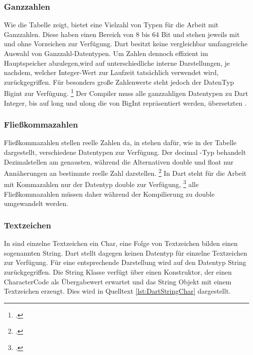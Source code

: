 \subsubsection{Ganzzahlen}
Wie die Tabelle zeigt,  bietet \Csharp eine Vielzahl von Typen für die Arbeit mit Ganzzahlen.  Diese haben einen Bereich von 8 bis 64 Bit und stehen jeweils mit und ohne Vorzeichen zur Verfügung.  Dart besitzt keine vergleichbar umfangreiche Auswahl von Ganzzahl-Datentypen.  Um Zahlen dennoch effizient im Hauptspeicher abzulegen,wird auf unterschiedliche interne Darstellungen,  je nachdem,  welcher Integer-Wert zur Laufzeit tatsächlich verwendet wird, zurückgegriffen.  Für besonders große Zahlenwerte steht jedoch der DatenTyp \glq Bigint \grq{}  zur Verfügung.  \footcite[Vgl. ][Abgerufen am \today]{Ford2019} Der Compiler muss alle ganzzahligen  \Csharp Datentypen zu Dart \glq Integer\grq,  bis auf \glq long\grq{} und \glq ulong\grq{} die von \glq BigInt\grq{}  repräsentiert werden, übersetzten . 

\subsubsection{Fließkommazahlen}


Fließkommazahlen stellen reelle Zahlen da,  in \Csharp stehen dafür, wie in der Tabelle dargestellt,  verschiedene Datentypen zur Verfügung.  Der \glq decimal\grq{} -Typ behandelt Dezimalstellen am genausten,  während die Alternativen \glq double\grq{} und  \glq float\grq{} nur Annäherungen an bestimmte reelle Zahl darstellen.  \footcite[Vgl. ][Abgerufen am \today]{MicrosoftFlieskomma2021}
In Dart steht für die Arbeit mit Kommazahlen nur der Datentyp \glq  double\grq{} zur Verfügung, \footcite[Vgl. ][Abgerufen am \today]{GoogleDouble} alle Fließkommazahlen müssen daher während der Kompilierung zu \glq double\grq{} umgewandelt werden.

\subsubsection{Textzeichen}

In \Csharp sind einzelne Textzeichen ein \glq  Char\grq, eine Folge von Textzeichen bilden einen  sogenannten \glq  String\grq.  Dart stellt dagegen keinen Datentyp für einzelne Textzeichen zur Verfügung.  Für eine entsprechende Darstellung wird auf den Datentyp \glq  String\grq{} zurückgegriffen.  Die  \glq String\grq{} Klasse verfügt über einen Konstruktor, der einen \glq CharacterCode\grq{} als Übergabewert erwartet und das String Objekt mit einem  Textzeichen erzeugt. Dies wird in Quelltext \ref{lst:DartStringChar} dargestellt.



